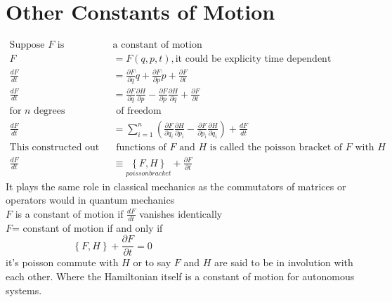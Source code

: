 \section{Other Constants of Motion}
\begin{align*}
\text{Suppose $F$ is }&\text{a constant of motion}\\
F&=F(q,p,t), \text{it could be explicity time dependent}\\
\frac{dF}{dt}&=\frac{\partial F}{\partial q}\dot{q}+\frac{\partial F}{\partial p}\dot{p}+\frac{\partial F}{\partial t}\\
\frac{dF}{dt}&=\frac{\partial F}{\partial q}\frac{\partial H}{\partial p}-\frac{\partial F}{\partial p}\frac{\partial H}{\partial q}+\frac{\partial F}{\partial t}\\
\text{for $n$ degrees}&\text{ of freedom}\\
\frac{dF}{dt}&=\sum\limits_{i=1}^{n}\left( \frac{\partial F}{\partial q_i}  \frac{\partial H}{\partial p_i}-\frac{\partial F}{\partial p_i}  \frac{\partial H}{\partial q_i} \right)+\frac{dF}{dt}\\
\text{This constructed out of 2}&\text{ functions of $F$ and $H$ is called the poisson bracket of $F$ with $H$}\\
\frac{dF}{dt}&\equiv \underset{poisson bracket}{\left\lbrace F,H\right\rbrace }+ \frac{\partial F}{\partial t}
\end{align*}
It plays the same role in classical mechanics as the commutators of matrices or operators would in quantum mechanics \\
$F$ is a constant of motion if $\frac{dF}{dt}$ vanishes identically\\
$F$= constant of motion if and only if
$$\left\lbrace F,H\right\rbrace +\frac{\partial F}{\partial t}=0\hspace{6cm}$$
it's poisson commute with $H$ or to say $F$ and $H$ are said to be in involution with each other. Where the Hamiltonian itself is a constant of motion for autonomous systems.
